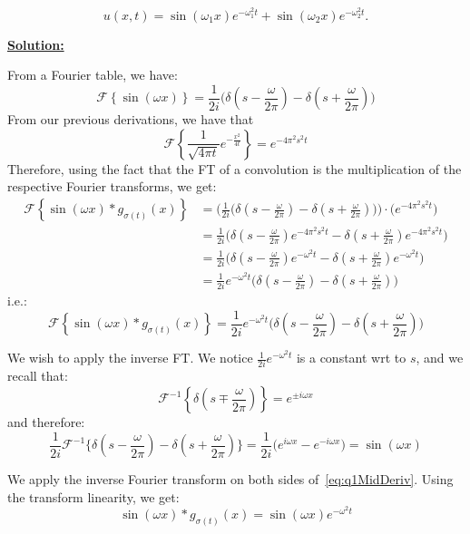\documentclass{article}
\begin{document}
\begin{equation}
u(x,t) = \sin(\omega_1 x)e^{-\omega_1^2 t} + \sin(\omega_2 x)e^{-\omega_2^2 t}.
\end{equation}

\textbf{\ul{Solution:}}

From a Fourier table, we have:
\[
  \mathcal{F} \left\{ \sin(\omega x) \right\} =  \frac{1}{2 i} \Big( \delta(s- \frac{\omega}{2 \pi}) - \delta(s + \frac{\omega}{2 \pi}) \Big) 
\]
From our previous derivations, we have that
\[
  \mathcal{F} \left\{ \frac{1}{\sqrt{ 4 \pi t }} e^{- \frac{x ^2}{4t}}  \right\}  = e^{- 4 \pi ^2 s ^2 t}
\]
Therefore, using the fact that the FT of a convolution is the multiplication of the respective Fourier transforms, we get:
\begin{align*}
  \mathcal{F} \left\{ \sin(\omega x) \ast g_{\sigma(t)}(x)   \right\}  &= \Big( \frac{1}{2 i} \big( \delta(s- \frac{\omega}{2 \pi}) - \delta(s + \frac{\omega}{2 \pi}) \big) 
  \Big) \cdot  \Big( e^{- 4 \pi ^2 s ^2 t}  \Big) \\
  &=  \frac{1}{2 i} \Big( \delta(s- \frac{\omega}{2 \pi}) e^{- 4 \pi ^2 s ^2 t} - \delta(s + \frac{\omega}{2 \pi}) e^{-4 \pi ^2 s ^2 t} \Big) \\
  &= \frac{1}{2 i} \Big( \delta(s-\frac{\omega}{2 \pi}) e^{- \omega ^2 t } - \delta(s + \frac{\omega}{2 \pi}) e^{- \omega ^2 t} \Big) \\
  &= \frac{1 }{2 i} e^{- \omega ^2 t} \Big( \delta(s- \frac{\omega}{2 \pi}) - \delta(s + \frac{\omega}{2 \pi}) \Big) 
\end{align*}
i.e.:
\begin{equation} \label{eq:q1MidDeriv}
  \mathcal{F} \left\{ \sin(\omega x) \ast g_{\sigma(t)}(x)   \right\}  = \frac{1 }{2 i} e^{- \omega ^2 t} \Big( \delta(s- \frac{\omega}{2 \pi}) - \delta(s + \frac{\omega}{2 \pi}) \Big) 
\end{equation}


We wish to apply the inverse FT. We notice $\frac{1 }{2 i} e^{- \omega ^2 t}$ is a constant wrt to $s$, and we recall that:
\[
  \mathcal{F} ^{-1}  \left\{  \delta(s \mp  \frac{\omega}{2 \pi} ) \right\} = e^{\pm  i \omega x} 
\]
and therefore:
\[
  \frac{1}{2 i} \mathcal{F} ^{-1} \Big\{ \delta(s- \frac{\omega}{2 \pi}) - \delta(s + \frac{\omega}{2 \pi})  \Big\} = \frac{1 }{2 i} \big( e^{ i \omega x} - e^{-i \omega x}  \big) = \sin(\omega x)
\]

We apply the inverse Fourier transform on both sides of~\cref{eq:q1MidDeriv}. Using the transform linearity, we get:
\[
  \sin(\omega x) \ast  g_{\sigma(t)}(x) = \sin(\omega x)  e^{-\omega ^2 t} 
\]
\end{document}

